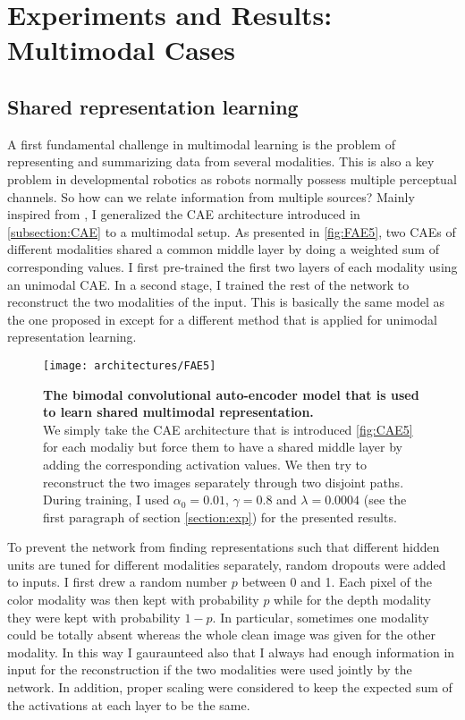 \section{Experiments and Results: Multimodal Cases} \label{section:multi}

\subsection{Shared representation learning} \label{subsection:shared}

A first fundamental challenge in multimodal learning is the problem
of representing and summarizing data from several modalities.
This is also a key problem in developmental robotics as robots
normally possess multiple perceptual channels.
So how can we relate information from multiple sources?
Mainly inspired from \cite{J. Ngiam 2011, A. Droniou 2014},
I generalized the CAE architecture introduced in \ref{subsection:CAE}
to a multimodal setup. As presented in \autoref{fig:FAE5}, two CAEs
of different modalities shared a common middle layer by doing a weighted sum
of corresponding values. I first pre-trained the first two layers
of each modality using an unimodal CAE. In a second stage, I trained the
rest of the network to reconstruct the two modalities of the input.
This is basically the same model as the one proposed in
\cite{J. Ngiam 2011} except for a different method that is applied for
unimodal representation learning.

\vspace{-0.5em}
\begin{figure}[H]
  \centering
  \texttt{[image: architectures/FAE5]}
  \caption{%
    \textbf{The bimodal convolutional auto-encoder model that is
      used to learn shared multimodal representation.}\\[0.1em]
    We simply take the CAE architecture that is introduced
      \autoref{fig:CAE5} for each modaliy but force them to have a
      shared middle layer by adding the corresponding activation values.
      We then try to reconstruct the two images separately through
      two disjoint paths. During training, I used $\alpha_0=0.01$,
      $\gamma = 0.8$ and $\lambda = 0.0004$ (see the first paragraph
      of section \ref{section:exp}) for the presented results.}
  \label{fig:FAE5}
\end{figure}

To prevent the network from finding representations such that different
hidden units are tuned for different modalities separately, random
dropouts were added to inputs. I first drew a random number $p$ between
0 and 1. Each pixel of the color modality was then kept with probability $p$
while for the depth modality they were kept with probability $1-p$.
In particular, sometimes one modality could be totally absent whereas
the whole clean image was given for the other modality.
In this way I gauraunteed also that I always had enough information
in input for the reconstruction if the two modalities were
used jointly by the network.
In addition, proper scaling were considered to keep the expected
sum of the activations at each layer to be the same.


